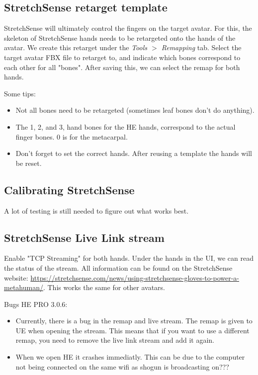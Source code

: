 \documentclass{uva-inf-article}
\begin{document}
\subsection{StretchSense retarget template}
StretchSense will ultimately control the fingers on the target avatar. For this, the skeleton of StretchSense hands needs to be retargeted onto the hands of the avatar. We create this retarget under the \textit{Tools $>$ Remapping} tab. Select the target avatar FBX file to retarget to, and indicate which bones correspond to each other for all "bones". After saving this, we can select the remap for both hands.

Some tips:
\begin{itemize}
    \item Not all bones need to be retargeted (sometimes leaf bones don't do anything).
    \item The 1, 2, and 3, hand bones for the HE hands, correspond to the actual finger bones. 0 is for the metacarpal.
    \item Don't forget to set the correct hands. After reusing a template the hands will be reset.
\end{itemize}

\subsection{Calibrating StretchSense}
A lot of testing is still needed to figure out what works best.


\subsection{StretchSense Live Link stream}
Enable "TCP Streaming" for both hands. Under the hands in the UI, we can read the status of the stream.
All information can be found on the StretchSense website: \url{https://stretchsense.com/news/using-stretchsense-gloves-to-power-a-metahuman/}.
This works the same for other avatars.

Bugs HE PRO 3.0.6:
\begin{itemize}
    \item Currently, there is a bug in the remap and live stream. The remap is given to UE when opening the stream. This means that if you want to use a different remap, you need to remove the live link stream and add it again.
    \item When we open HE it crashes immediatly. This can be due to the computer not being connected on the same wifi as shogun is broadcasting on??? 
\end{itemize}
\end{document}
